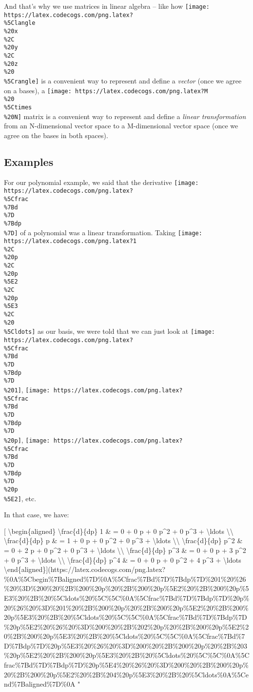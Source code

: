 \documentclass[]{article}
\begin{document}
And that's why we use matrices in linear algebra -- like how
\texttt{[image: https://latex.codecogs.com/png.latex?\\\%5Clangle\\\%20x\\\%2C\\\%20y\\\%2C\\\%20z\\\%20\\\%5Crangle]}
is a convenient way to represent and define a \emph{vector} (once we agree on a
bases), a
\texttt{[image: https://latex.codecogs.com/png.latex?M\\\%20\\\%5Ctimes\\\%20N]}
matrix is a convenient way to represent and define a \emph{linear
transformation} from an N-dimensional vector space to a M-dimensional vector
space (once we agree on the bases in both spaces).

\hypertarget{examples}{%
\subsection{Examples}\label{examples}}

For our polynomial example, we said that the derivative
\texttt{[image: https://latex.codecogs.com/png.latex?\\\%5Cfrac\\\%7Bd\\\%7D\\\%7Bdp\\\%7D]}
of a polynomial was a linear transformation. Taking
\texttt{[image: https://latex.codecogs.com/png.latex?1\\\%2C\\\%20p\\\%2C\\\%20p\\\%5E2\\\%2C\\\%20p\\\%5E3\\\%2C\\\%20\\\%5Cldots]}
as our basis, we were told that we can just look at
\texttt{[image: https://latex.codecogs.com/png.latex?\\\%5Cfrac\\\%7Bd\\\%7D\\\%7Bdp\\\%7D\\\%201]},
\texttt{[image: https://latex.codecogs.com/png.latex?\\\%5Cfrac\\\%7Bd\\\%7D\\\%7Bdp\\\%7D\\\%20p]},
\texttt{[image: https://latex.codecogs.com/png.latex?\\\%5Cfrac\\\%7Bd\\\%7D\\\%7Bdp\\\%7D\\\%20p\\\%5E2]},
etc.

In that case, we have:

{[} \textbackslash{}begin\{aligned\} \textbackslash{}frac\{d\}\{dp\} 1 \& = 0 +
0 p + 0 p\^{}2 + 0 p\^{}3 + \textbackslash{}ldots
\textbackslash{}\textbackslash{} \textbackslash{}frac\{d\}\{dp\} p \& = 1 + 0 p
+ 0 p\^{}2 + 0 p\^{}3 + \textbackslash{}ldots \textbackslash{}\textbackslash{}
\textbackslash{}frac\{d\}\{dp\} p\^{}2 \& = 0 + 2 p + 0 p\^{}2 + 0 p\^{}3 +
\textbackslash{}ldots \textbackslash{}\textbackslash{}
\textbackslash{}frac\{d\}\{dp\} p\^{}3 \& = 0 + 0 p + 3 p\^{}2 + 0 p\^{}3 +
\textbackslash{}ldots \textbackslash{}\textbackslash{}
\textbackslash{}frac\{d\}\{dp\} p\^{}4 \& = 0 + 0 p + 0 p\^{}2 + 4 p\^{}3 +
\textbackslash{}ldots
\textbackslash{}end\{aligned\}{]}(https://latex.codecogs.com/png.latex?\%0A\%5Cbegin\%7Baligned\%7D\%0A\%5Cfrac\%7Bd\%7D\%7Bdp\%7D\%201\%20\%26\%20\%3D\%200\%20\%2B\%200\%20p\%20\%2B\%200\%20p\%5E2\%20\%2B\%200\%20p\%5E3\%20\%2B\%20\%5Cldots\%20\%5C\%5C\%0A\%5Cfrac\%7Bd\%7D\%7Bdp\%7D\%20p\%20\%26\%20\%3D\%201\%20\%2B\%200\%20p\%20\%2B\%200\%20p\%5E2\%20\%2B\%200\%20p\%5E3\%20\%2B\%20\%5Cldots\%20\%5C\%5C\%0A\%5Cfrac\%7Bd\%7D\%7Bdp\%7D\%20p\%5E2\%20\%26\%20\%3D\%200\%20\%2B\%202\%20p\%20\%2B\%200\%20p\%5E2\%20\%2B\%200\%20p\%5E3\%20\%2B\%20\%5Cldots\%20\%5C\%5C\%0A\%5Cfrac\%7Bd\%7D\%7Bdp\%7D\%20p\%5E3\%20\%26\%20\%3D\%200\%20\%2B\%200\%20p\%20\%2B\%203\%20p\%5E2\%20\%2B\%200\%20p\%5E3\%20\%2B\%20\%5Cldots\%20\%5C\%5C\%0A\%5Cfrac\%7Bd\%7D\%7Bdp\%7D\%20p\%5E4\%20\%26\%20\%3D\%200\%20\%2B\%200\%20p\%20\%2B\%200\%20p\%5E2\%20\%2B\%204\%20p\%5E3\%20\%2B\%20\%5Cldots\%0A\%5Cend\%7Baligned\%7D\%0A
"
\end{document}

